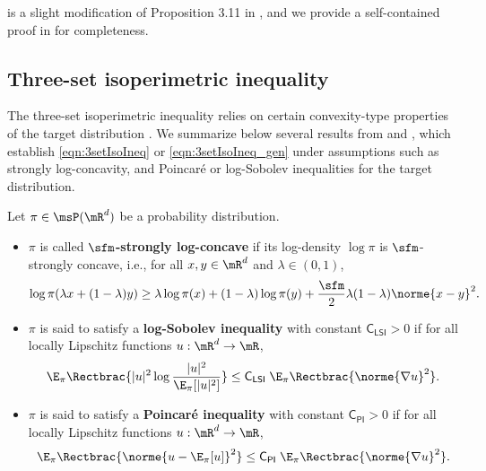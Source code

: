 \documentclass[11pt]{article}
\newcommand{\CPI}{\mathsf{C_{PI}}}
\newcommand{\CLSI}{\mathsf{C_{LSI}}}
\begin{document}
 is a slight modification of Proposition 3.11 in \cite{goyal2025mixing}, and we provide a self-contained proof in  for completeness.




\subsection{Three-set isoperimetric inequality}
\label{sec:3setIsoIneq}

The three-set isoperimetric inequality relies on certain convexity-type properties of the target distribution \citep{MR2507637,24-AAP2058,goyal2025mixing}.
%
We summarize below several results from \cite{24-AAP2058} and \cite{goyal2025mixing}, which establish \eqref{eqn:3setIsoIneq} or \eqref{eqn:3setIsoIneq_gen} under assumptions such as strongly log-concavity, and Poincar\'e or log-Sobolev inequalities for the target distribution.

\begin{defn}
\label{defn:convexity}
Let $\pi \in \msP(\mR^d)$ be a probability distribution.

\begin{itemize}
    \item $\pi$ is called \textbf{$\sfm$-strongly log-concave} if its log-density $\log \pi$ is $\sfm$-strongly concave, i.e., for all $x,y\in\mR^d$ and $\lambda\in(0,1)$,
    \begin{equation}
    \label{eqn:convex}
        \log \pi ( \lambda x + (1-\lambda) y ) \ge \lambda \log \pi(x) + (1-\lambda) \log \pi(y) + \frac{\sfm}{2} \lambda (1-\lambda) \norme{x-y}^2.
    \end{equation}

    \item $\pi$ is said to satisfy a \textbf{log-Sobolev inequality} with constant $\CLSI>0$ if for all locally Lipschitz functions $u:\mR^d\to\mR$,
    \begin{equation}
    \label{eqn:logSobolev}
        \E_\pi \Rectbrac{ |u|^2 \log \frac{ |u|^2 }{ \E_\pi [|u|^2] } } \le \CLSI \; \E_\pi \Rectbrac{ \norme{ \nabla u }^2 }.
    \end{equation}

    \item $\pi$ is said to satisfy a \textbf{Poincar\'e inequality} with constant $\CPI>0$ if for all locally Lipschitz functions $u:\mR^d\to\mR$,
    \begin{equation}
    \label{eqn:Poincare}
        \E_\pi \Rectbrac{ \norme{ u - \E_\pi [u] }^2 } \le \CPI \; \E_\pi \Rectbrac{ \norme{ \nabla u }^2 }.
    \end{equation}
\end{itemize}
\end{defn}
\end{document}
